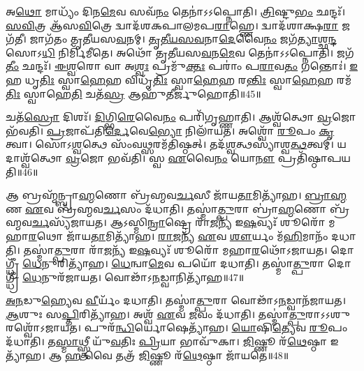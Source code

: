 𑌅\-\ul{𑌥𑍋} 𑌮𑌾𑌧𑍍𑌯𑌂᳴ 𑌦𑌿𑌨\-\ul{𑌮𑍇}\-𑌵 𑌸𑌵᳴\-\ul{𑌨𑌂} 𑌤𑍇𑌨𑌾॑𑌽𑌽𑌪𑍍𑌨𑍋𑌤𑌿।
\-\ul{𑌤𑍍𑌰𑌿}\-𑌷𑍍𑌟𑍁\-\ul{𑌭𑌂} 𑌛𑌨𑍍𑌦𑌃᳴।
\-\ul{𑌸}\-\-\ul{𑌵𑌿}\-𑌤𑍍𑌰 𑌆᳴𑌸\-\ul{𑌵𑌿}\-𑌤𑍍𑌰𑍇 𑌦𑍍𑌵𑌾𑌦᳴𑌶𑌕𑌪𑌾𑌲𑌮𑌪\-\ul{𑌰𑌾}\-𑌹𑍍𑌣𑍇।
𑌦𑍍𑌵𑌾𑌦᳴𑌶𑌾𑌕𑍍𑌷\-\ul{𑌰𑌾} 𑌜𑌗᳴𑌤𑍀।
𑌜𑌾𑌗᳴𑌤𑌂 𑌤𑍃𑌤𑍀𑌯𑌸\-\ul{𑌵}\-𑌨𑌮𑍍।
\-\ul{𑌤𑍃}\-\-\ul{𑌤𑍀}\-\-\ul{𑌯}\-\-\ul{𑌸}\-\-\ul{𑌵}\-𑌨𑌾\-\ul{𑌦𑍇}\-𑌵𑍈\-\ul{𑌨𑌂} 𑌜𑌗᳴\-\ul{𑌤𑍍𑌯𑌾}\-𑌶𑍍𑌛\-\ul{𑌨𑍍𑌦}\-𑌸𑍋𑌽\-\ul{𑌧𑌿} 𑌨𑌿𑌰𑍍𑌮𑌿᳴𑌮𑍀𑌤𑍇।
𑌅𑌥𑍋᳴ 𑌤𑍃𑌤𑍀𑌯𑌸\-\ul{𑌵}\-𑌨\-\ul{𑌮𑍇}\-𑌵 𑌤𑍇𑌨𑌾॑𑌽𑌽𑌪𑍍𑌨𑍋𑌤𑌿।
𑌜𑌗᳴\-\ul{𑌤𑍀𑌂} 𑌛𑌨𑍍𑌦𑌃᳴।
\-\ul{𑌈}\-\-\ul{𑌶𑍍𑌵}\-𑌰𑍋 𑌵𑌾 𑌅\-\ul{𑌶𑍍𑌵𑌃} 𑌪𑍍𑌰𑌮𑍁᳴\-\ul{𑌕𑍍𑌤𑌃} 𑌪𑌰𑌾𑌂॑ 𑌪\-\ul{𑌰𑌾}\-𑌵\-\ul{𑌤𑌂} 𑌗𑌨𑍍𑌤𑍋𑌃॑।
\-\ul{𑌇}\-𑌹 𑌧𑍃\-\ul{𑌤𑌿𑌃} 𑌸𑍍𑌵𑌾\-\ul{𑌹𑍇}\-𑌹 𑌵𑌿𑌧𑍃᳴\-\ul{𑌤𑌿𑌃} 𑌸𑍍𑌵𑌾\-\ul{𑌹𑍇}\-𑌹 𑌰\-\ul{𑌨𑍍𑌤𑌿𑌃} 𑌸𑍍𑌵𑌾\-\ul{𑌹𑍇}\-𑌹 𑌰𑌮᳴\-\ul{𑌤𑌿𑌃} 𑌸𑍍𑌵𑌾𑌹𑍇\-\ul{𑌤𑌿} 𑌚𑌤᳴\-\ul{𑌸𑍍𑌰} 𑌆𑌹𑍁᳴𑌤𑍀𑌰𑍍𑌜𑍁𑌹𑍋𑌤𑌿॥45॥

𑌚𑌤᳴\-\ul{𑌸𑍍𑌰𑍋} 𑌦𑌿𑌶𑌃᳴।
\-\ul{𑌦𑌿}\-𑌗𑍍𑌭𑌿\-\ul{𑌰𑍇}\-𑌵𑍈\-\ul{𑌨𑌂} 𑌪𑌰𑌿᳴𑌗𑍃𑌹𑍍𑌣𑌾𑌤𑌿।
𑌆𑌶𑍍𑌵᳴𑌤𑍍𑌥𑍋 \ul{𑌵𑍍𑌰}\-𑌜𑍋 𑌭᳴𑌵𑌤𑌿।
\-\ul{𑌪𑍍𑌰}\-𑌜𑌾𑌪᳴𑌤𑌿\-\ul{𑌰𑍍𑌦𑍇}\-𑌵𑍇\-\ul{𑌭𑍍𑌯𑍋} 𑌨𑌿𑌲𑌾᳴𑌯𑌤।
𑌅𑌶𑍍𑌵𑍋᳴ \ul{𑌰𑍂}\-𑌪𑌂 \ul{𑌕𑍃}\-𑌤𑍍𑌵𑌾।
𑌸𑍋॑𑌽\-\ul{𑌶𑍍𑌵}\-𑌤𑍍𑌥𑍇 𑌸𑌂᳴𑌵\-\ul{𑌥𑍍𑌸}\-𑌰𑌮᳴𑌤𑌿𑌷𑍍𑌠𑌤𑍍।
𑌤𑌦᳴\-\ul{𑌶𑍍𑌵}\-𑌤𑍍𑌥𑌸𑍍𑌯𑌾॑𑌶𑍍𑌵\-\ul{𑌤𑍍𑌥}\-𑌤𑍍𑌵𑌮𑍍।
𑌯𑌦𑌾𑌶𑍍𑌵᳴𑌤𑍍𑌥𑍋 \ul{𑌵𑍍𑌰}\-𑌜𑍋 𑌭𑌵᳴𑌤𑌿।
𑌸𑍍𑌵 \ul{𑌏}\-𑌵𑍈\-\ul{𑌨𑌂} 𑌯𑍋\-\ul{𑌨𑍗} 𑌪𑍍𑌰𑌤𑌿᳴\-𑌷𑍍𑌠𑌾𑌪𑌯𑌤𑌿॥46॥\anuvakamend[\-\ul{𑌤𑍍𑌰𑌿}\-𑌷𑍍𑌟𑍁\-\ul{𑌭}\-𑌶𑍍𑌛\-\ul{𑌨𑍍𑌦}\-𑌸𑍋𑌽\-\ul{𑌧𑌿} 𑌨𑌿𑌰𑍍𑌮𑌿᳴𑌮𑍀𑌤𑍇 𑌜𑍁𑌹𑍋\-\ul{𑌤𑌿} 𑌨𑌵᳴ 𑌚]

𑌆 𑌬𑍍𑌰𑌹𑍍𑌮᳴𑌨𑍍𑌬𑍍𑌰𑌾\-\ul{𑌹𑍍𑌮}\-𑌣𑍋 𑌬𑍍𑌰᳴𑌹𑍍𑌮𑌵\-\ul{𑌰𑍍𑌚}\-𑌸𑍀 𑌜𑌾᳴𑌯\-\ul{𑌤𑌾}\-𑌮𑌿𑌤𑍍𑌯𑌾᳴𑌹।
\-\ul{𑌬𑍍𑌰𑌾}\-\-\ul{𑌹𑍍𑌮}\-𑌣 \ul{𑌏}\-𑌵 𑌬𑍍𑌰᳴𑌹𑍍𑌮𑌵\-\ul{𑌰𑍍𑌚}\-𑌸𑌂 𑌦᳴𑌧𑌾𑌤𑌿।
𑌤𑌸𑍍𑌮𑌾॑\-\ul{𑌤𑍍𑌪𑍁}\-𑌰𑌾 𑌬𑍍𑌰𑌾॑\-\ul{𑌹𑍍𑌮}\-𑌣𑍋 𑌬𑍍𑌰᳴𑌹𑍍𑌮𑌵\-\ul{𑌰𑍍𑌚}\-𑌸𑍍𑌯᳴𑌜𑌾𑌯𑌤।
𑌆𑌽𑌸𑍍𑌮𑌿\-\ul{𑌨𑍍𑌰𑌾}\-𑌷𑍍𑌟𑍍𑌰𑍇 𑌰𑌾᳴\-\ul{𑌜}\-𑌨𑍍𑌯᳴ 𑌇\-\ul{𑌷}\-𑌵𑍍𑌯𑌃᳴ 𑌶𑍂𑌰𑍋᳴ 𑌮𑌹𑌾\-\ul{𑌰}\-𑌥𑍋 𑌜𑌾᳴𑌯\-\ul{𑌤𑌾}\-𑌮𑌿𑌤𑍍𑌯𑌾᳴𑌹।
\-\ul{𑌰𑌾}\-\-\ul{𑌜}\-𑌨𑍍𑌯᳴ \ul{𑌏}\-𑌵 \ul{𑌶𑍗}\-𑌰𑍍𑌯𑌂 𑌮᳴\-\ul{𑌹𑌿}\-𑌮𑌾𑌨𑌂᳴ 𑌦𑌧𑌾𑌤𑌿।
𑌤𑌸𑍍𑌮𑌾॑\-\ul{𑌤𑍍𑌪𑍁}\-𑌰𑌾 𑌰𑌾᳴\-\ul{𑌜}\-𑌨𑍍𑌯᳴ 𑌇\-\ul{𑌷}\-𑌵𑍍𑌯𑌃᳴ 𑌶𑍂𑌰𑍋᳴ 𑌮𑌹𑌾\-\ul{𑌰}\-𑌥𑍋᳴\-𑌽𑌜𑌾𑌯𑌤।
𑌦𑍋𑌗𑍍𑌧𑍍𑌰𑍀᳴ \ul{𑌧𑍇}\-𑌨𑍁𑌰𑌿𑌤𑍍𑌯𑌾᳴𑌹।
\-\ul{𑌧𑍇}\-𑌨𑍍𑌵𑌾\-\ul{𑌮𑍇}\-𑌵 𑌪𑌯𑍋᳴ 𑌦𑌧𑌾𑌤𑌿।
𑌤𑌸𑍍𑌮𑌾॑\-\ul{𑌤𑍍𑌪𑍁}\-𑌰𑌾 𑌦𑍋𑌗𑍍𑌧𑍍𑌰𑍀᳴ \ul{𑌧𑍇}\-𑌨𑍁𑌰᳴𑌜𑌾𑌯𑌤।
𑌵𑍋𑌢𑌾᳴\-𑌽\-\ul{𑌨}\-𑌡𑍍𑌵𑌾𑌨𑌿𑌤𑍍𑌯𑌾᳴𑌹॥47॥

\-\ul{𑌅}\-\-\ul{𑌨}\-𑌡𑍁\-\ul{𑌹𑍍𑌯𑍇}\-𑌵 \ul{𑌵𑍀}\-𑌰𑍍𑌯𑌂᳴ 𑌦𑌧𑌾𑌤𑌿।
𑌤𑌸𑍍𑌮𑌾॑\-\ul{𑌤𑍍𑌪𑍁}\-𑌰𑌾 𑌵𑍋𑌢𑌾᳴\-𑌽\-\ul{𑌨}\-𑌡𑍍𑌵𑌾𑌨᳴𑌜𑌾𑌯𑌤।
\-\ul{𑌆}\-𑌶𑍁𑌃 𑌸\-\ul{𑌪𑍍𑌤𑌿}\-𑌰𑌿𑌤𑍍𑌯𑌾᳴𑌹।
𑌅𑌶𑍍𑌵᳴ \ul{𑌏}\-𑌵 \ul{𑌜}\-𑌵𑌂 𑌦᳴𑌧𑌾𑌤𑌿।
𑌤𑌸𑍍𑌮𑌾॑\-\ul{𑌤𑍍𑌪𑍁}\-𑌰𑌾\-𑌽𑌽𑌶𑍁𑌰𑌶𑍍𑌵𑍋᳴\-𑌽𑌜𑌾𑌯𑌤।
𑌪𑍁𑌰᳴\-\ul{𑌨𑍍𑌧𑌿}\-𑌰𑍍𑌯𑍋𑌷𑍇𑌤𑍍𑌯𑌾᳴𑌹।
\-\ul{𑌯𑍋}\-𑌷𑌿\-\ul{𑌤𑍍𑌯𑍇}\-𑌵 \ul{𑌰𑍂}\-𑌪𑌂 𑌦᳴𑌧𑌾𑌤𑌿।
𑌤\-\ul{𑌸𑍍𑌮𑌾}\-𑌥𑍍𑌸𑍍𑌤𑍍𑌰𑍀 𑌯𑍁᳴\-\ul{𑌵}\-𑌤𑌿𑌃 \ul{𑌪𑍍𑌰𑌿}\-𑌯𑌾 𑌭𑌾𑌵𑍁᳴𑌕𑌾।
\-\ul{𑌜𑌿}\-𑌷𑍍𑌣𑍂 𑌰᳴\-\ul{𑌥𑍇}\-𑌷𑍍𑌠𑌾 𑌇𑌤𑍍𑌯𑌾᳴𑌹।
𑌆 \ul{𑌹} 𑌵𑍈 𑌤𑌤𑍍𑌰᳴ \ul{𑌜𑌿}\-𑌷𑍍𑌣𑍂 𑌰᳴\-\ul{𑌥𑍇}\-𑌷𑍍𑌠𑌾 𑌜𑌾᳴𑌯𑌤𑍇॥48॥


